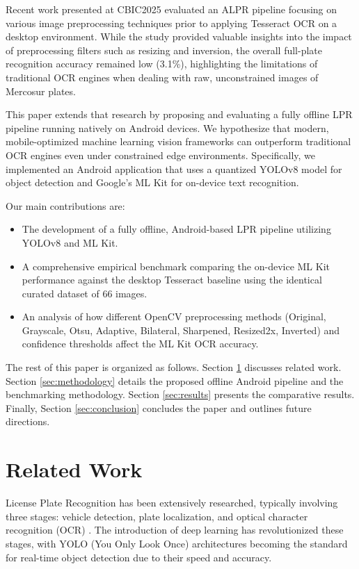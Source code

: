 \documentclass[conference]{IEEEtran}
\begin{document}
Recent work presented at CBIC2025 \cite{cbic2025} evaluated an ALPR pipeline focusing on various image preprocessing techniques prior to applying Tesseract OCR on a desktop environment. While the study provided valuable insights into the impact of preprocessing filters such as resizing and inversion, the overall full-plate recognition accuracy remained low (3.1\%), highlighting the limitations of traditional OCR engines when dealing with raw, unconstrained images of Mercosur plates.

This paper extends that research by proposing and evaluating a fully offline LPR pipeline running natively on Android devices. We hypothesize that modern, mobile-optimized machine learning vision frameworks can outperform traditional OCR engines even under constrained edge environments. Specifically, we implemented an Android application that uses a quantized YOLOv8 model \cite{jocher2023yolov8} for object detection and Google's ML Kit \cite{google2023mlkit} for on-device text recognition. 

Our main contributions are:
\begin{itemize}
    \item The development of a fully offline, Android-based LPR pipeline utilizing YOLOv8 and ML Kit.
    \item A comprehensive empirical benchmark comparing the on-device ML Kit performance against the desktop Tesseract baseline using the identical curated dataset of 66 images.
    \item An analysis of how different OpenCV \cite{bradski2000opencv} preprocessing methods (Original, Grayscale, Otsu, Adaptive, Bilateral, Sharpened, Resized2x, Inverted) and confidence thresholds affect the ML Kit OCR accuracy.
\end{itemize}

The rest of this paper is organized as follows. Section \ref{sec:related} discusses related work. Section \ref{sec:methodology} details the proposed offline Android pipeline and the benchmarking methodology. Section \ref{sec:results} presents the comparative results. Finally, Section \ref{sec:conclusion} concludes the paper and outlines future directions.

\section{Related Work}
\label{sec:related}
License Plate Recognition has been extensively researched, typically involving three stages: vehicle detection, plate localization, and optical character recognition (OCR) \cite{du2013automatic}. The introduction of deep learning has revolutionized these stages, with YOLO (You Only Look Once) architectures becoming the standard for real-time object detection due to their speed and accuracy.
\end{document}
